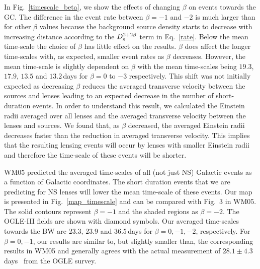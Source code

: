 \documentclass[iop,apj]{emulateapj}
\begin{document}
In Fig.~\ref{timescale_beta}, we show the effects of changing $\beta$ on events 
towards the GC. 
%
The difference in the event rate between $\beta=-1$ and $-2$ is much larger than 
for other $\beta$ values because the background source density starts to decrease with
increasing distance according to the $D_{\rm{s}}^{2+2\beta}$ term in Eq.~\ref{rate}.
%
Below the mean time-scale the choice of $\beta$ has little effect on 
the results. $\beta$ does affect the longer time-scales with, as expected, smaller event 
rates as $\beta$ decreases. However, the mean time-scale is slightly dependent on $\beta$ 
with the mean time-scales being $19.3$, $17.9$, $13.5$ and $13.2$\,days for $\beta = 0$ to 
$-3$ respectively. This shift was not initially expected as decreasing $\beta$ reduces 
the averaged transverse velocity between the sources and lenses leading to an expected 
decrease in the number of short-duration events. In order to understand this result, 
we calculated the Einstein radii averaged over all lenses and the averaged transverse velocity 
between the lenses and sources. We found that, as $\beta$ decreased, the averaged Einstein 
radii decreases faster than the reduction in averaged transverse velocity. This implies 
that the resulting lensing events will occur by lenses with smaller Einstein radii and 
therefore the time-scale of these events will be shorter.


WM05 predicted the averaged time-scales of all (not just NS) Galactic events as a function 
of Galactic coordinates. The short duration events that we are predicting for NS lenses will 
lower the mean time-scale of these events. Our map is presented in Fig.~\ref{map_timescale} and 
can be compared with Fig.~3 in WM05. The solid contours represent $\beta = -1$ and the 
shaded regions as $\beta = -2$. The OGLE-III fields are shown with diamond symbols.  
Our averaged time-scales towards the BW are $23.3$, $23.9$ and $36.5$\,days for $\beta=0,-1,-2$, 
respectively. For $\beta=0,-1$, our results are similar to, but slightly smaller than, 
the corresponding results in WM05 and generally agrees with the actual measurement of 
$28.1\pm4.3$\,days~\citep{sumi} from the 
OGLE survey.
\end{document}
